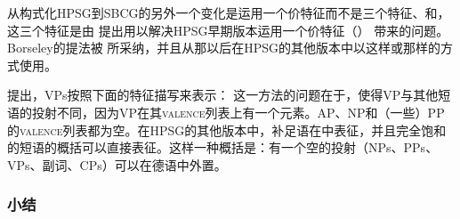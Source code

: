 从构式化HPSG到SBCG的另外一个变化是运用一个价特征而不是三个特征\sprc、\subjc 和\compsc，这三个特征是由 \citet{Borsley87}提出用以解决HPSG早期版本运用一个价特征（\subcatc） 带来的问题。Borseley的提法被 \citet[\S~9]{ps2}所采纳，并且从那以后在HPSG的其他版本中以这样或那样的方式使用。

 \citet[]{Sag2012a}提出，VPs按照下面的特征描写来表示：
\ea
{}
\z
这一方法的问题在于，使得VP与其他短语的投射不同，因为VP在其\textsc{valence}列表上有一个元素。AP、NP和（一些）PP的\textsc{valence}列表都为空。在HPSG的其他版本中，补足语在\compslc 中表征，并且\compslc 完全饱和的短语的概括可以直接表征。这样一种概括是：有一个空\compslc 的投射（NPs、PPs、VPs、副词、CPs）可以在德语中外置\citep[\S~13.1.2]{Mueller99a}。

\subsubsection{小结}

